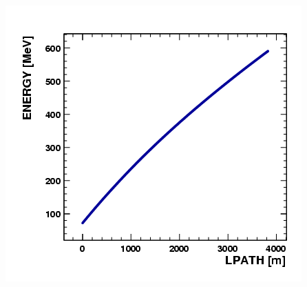 \documentclass{beamer}
\begin{document}
{\begin{columns}
\begin{column}{6.0cm}
	\includegraphics[width=\linewidth]{figures/Ring3Bunch-ENERGY-LPATH.png}
      \end{column}
    \end{columns}
  }
\end{document}
